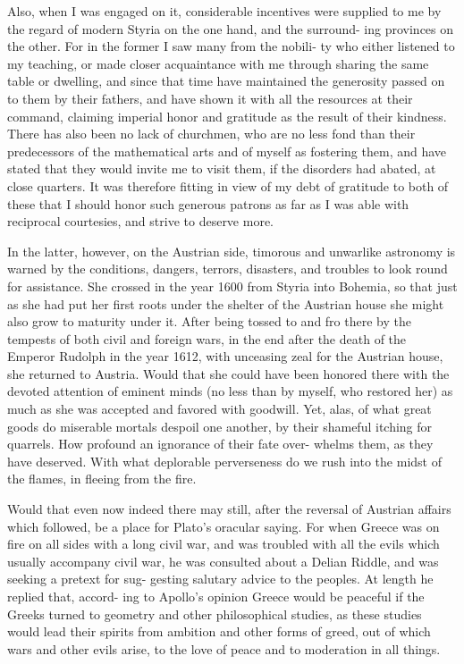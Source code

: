 \documentclass{article}
\begin{document}
{Also, when I was engaged on it, considerable incentives were supplied
to me by the regard of modern Styria on the one hand, and the surround-
ing provinces on the other. For in the former I saw many from the nobili-
ty who either listened to my teaching, or made closer acquaintance with
me through sharing the same table or dwelling, and since that time have
maintained the generosity passed on to them by their fathers, and have
shown it with all the resources at their command, claiming imperial
honor and gratitude as the result of their kindness. There has also been
no lack of churchmen, who are no less fond than their predecessors of
the mathematical arts and of myself as fostering them, and have stated
that they would invite me to visit them, if the disorders had abated, at
close quarters. It was therefore fitting in view of my debt of gratitude to
both of these that I should honor such generous patrons as far as I was
able with reciprocal courtesies, and strive to deserve more.

In the latter, however, on the Austrian side, timorous and unwarlike
astronomy is warned by the conditions, dangers, terrors, disasters, and
troubles to look round for assistance. She crossed in the year 1600 from
Styria into Bohemia, so that just as she had put her first roots under the
shelter of the Austrian house she might also grow to maturity under it.
After being tossed to and fro there by the tempests of both civil and
foreign wars, in the end after the death of the Emperor Rudolph in the
year 1612, with unceasing zeal for the Austrian house, she returned to
Austria. Would that she could have been honored there with the devoted
attention of eminent minds (no less than by myself, who restored her) as
much as she was accepted and favored with goodwill. Yet, alas, of what
great goods do miserable mortals despoil one another, by their shameful
itching for quarrels. How profound an ignorance of their fate over-
whelms them, as they have deserved. With what deplorable perverseness
do we rush into the midst of the flames, in fleeing from the fire.

Would that even now indeed there may still, after the reversal of
Austrian affairs which followed, be a place for Plato’s oracular saying.
For when Greece was on fire on all sides with a long civil war, and was
troubled with all the evils which usually accompany civil war, he was
consulted about a Delian Riddle, and was seeking a pretext for sug-
gesting salutary advice to the peoples. At length he replied that, accord-
ing to Apollo’s opinion Greece would be peaceful if the Greeks turned to
geometry and other philosophical studies, as these studies would lead
their spirits from ambition and other forms of greed, out of which wars
and other evils arise, to the love of peace and to moderation in all things.


}
\end{document}
